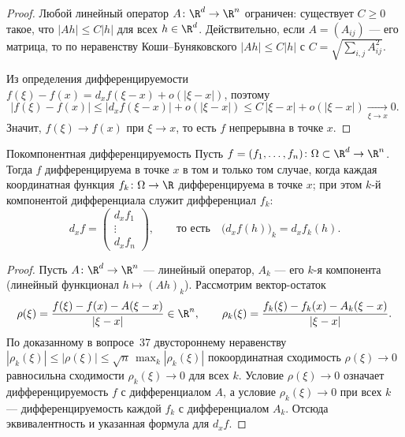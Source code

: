 \begin{proof}
	Любой линейный оператор $A\colon\R^d\to\R^n$ ограничен: существует $C\ge0$ такое, что $|Ah|\le C|h|$ для всех $h\in\R^d$. Действительно, если $A=(A_{ij})$ --- его матрица, то по неравенству Коши--Буняковского $|Ah|\le C|h|$ с $C=\sqrt{\sum_{i,j}A_{ij}^2}$.

	Из определения дифференцируемости $f(\xi)-f(x)=d_xf(\xi-x)+o(|\xi-x|)$, поэтому
	\[
	|f(\xi)-f(x)|\le |d_xf(\xi-x)|+o(|\xi-x|)\le C\,|\xi-x|+o(|\xi-x|)\xrightarrow[\xi\to x]{}0.
	\]
	Значит, $f(\xi)\to f(x)$ при $\xi\to x$, то есть $f$ непрерывна в точке $x$.
\end{proof}

\begin{Theorem}{Покомпонентная дифференцируемость}{}
	Пусть $f=(f_1,\dots,f_n)\colon\Omega\subset\R^d\to\R^n$. Тогда $f$ дифференцируема в точке $x$ в том и только том случае, когда каждая координатная функция $f_k\colon\Omega\to\R$ дифференцируема в точке $x$; при этом $k$-й компонентой дифференциала служит дифференциал $f_k$:
	\[
	d_xf=\begin{pmatrix} d_xf_1\\ \vdots\\ d_xf_n\end{pmatrix},
	\qquad\text{то есть}\quad \bigl(d_xf(h)\bigr)_k=d_xf_k(h).
	\]
\end{Theorem}

\begin{proof}
	Пусть $A\colon\R^d\to\R^n$ --- линейный оператор, $A_k$ --- его $k$-я компонента (линейный функционал $h\mapsto(Ah)_k$). Рассмотрим вектор-остаток
	\[
	\rho(\xi)=\frac{f(\xi)-f(x)-A(\xi-x)}{|\xi-x|}\in\R^n,\qquad
	\rho_k(\xi)=\frac{f_k(\xi)-f_k(x)-A_k(\xi-x)}{|\xi-x|}.
	\]
	По доказанному в вопросе~37 двустороннему неравенству $|\rho_k(\xi)|\le|\rho(\xi)|\le\sqrt n\,\max_k|\rho_k(\xi)|$ покоординатная сходимость $\rho(\xi)\to0$ равносильна сходимости $\rho_k(\xi)\to0$ для всех $k$. Условие $\rho(\xi)\to0$ означает дифференцируемость $f$ с дифференциалом $A$, а условие $\rho_k(\xi)\to0$ при всех $k$ --- дифференцируемость каждой $f_k$ с дифференциалом $A_k$. Отсюда эквивалентность и указанная формула для $d_xf$.
\end{proof}
